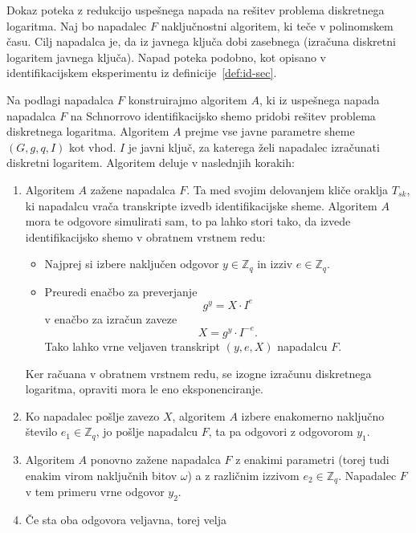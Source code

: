 \documentclass[isrm2, tisk]{fmfdelo}
\newcommand{\Z}{\mathbb Z}
\begin{document}
\begin{dokaz}
    Dokaz poteka z redukcijo uspešnega napada na rešitev problema diskretnega logaritma. Naj bo napadalec
    $F$ naključnostni algoritem, ki teče v polinomskem času. Cilj napadalca je, da iz javnega ključa
    dobi zasebnega (izračuna diskretni logaritem javnega ključa). Napad poteka podobno, kot opisano v
    identifikacijskem eksperimentu iz definicije~\ref{def:id-sec}.

    Na podlagi napadalca $F$ konstruirajmo algoritem $A$, ki iz uspešnega napada napadalca $F$ na
    Schnorrovo identifikacijsko shemo pridobi rešitev problema diskretnega logaritma. Algoritem $A$
    prejme vse javne parametre sheme $(G, g, q, I)$ kot vhod. $I$ je javni ključ, za katerega želi
    napadalec izračunati diskretni logaritem. Algoritem deluje v naslednjih korakih:
    \begin{enumerate}
        \item Algoritem $A$ zažene napadalca $F$. Ta med svojim delovanjem kliče oraklja $T_{sk}$,
            ki napadalcu vrača transkripte izvedb identifikacijske sheme. Algoritem $A$ mora te
            odgovore simulirati sam, to pa lahko stori tako, da izvede identifikacijsko shemo v
            obratnem vrstnem redu:
            \begin{itemize}
                \item Najprej si izbere naključen odgovor $y \in \Z_q$ in izziv $e \in \Z_q$.
                \item Preuredi enačbo za preverjanje
                    $$
                    g^y = X \cdot I^e
                    $$
                    v enačbo za izračun zaveze
                    $$
                    X = g^y \cdot I^{-e}.
                    $$
                    Tako lahko vrne veljaven transkript $(y, e, X)$ napadalcu $F$.
            \end{itemize}
            Ker račuana v obratnem vrstnem redu, se izogne izračunu diskretnega logaritma, opraviti
            mora le eno eksponenciranje.
        \item Ko napadalec pošlje zavezo $X$, algoritem $A$ izbere enakomerno naključno število $e_1
            \in \Z_q$, jo pošlje napadalcu $F$, ta pa odgovori z odgovorom $y_1$.
        \item Algoritem $A$ ponovno zažene napadalca $F$ z enakimi parametri (torej tudi enakim
            virom naključnih bitov $\omega$) a z različnim izzivom $e_2 \in \Z_q$. Napadalec
            $F$ v tem primeru vrne odgovor $y_2$.
        \item Če sta oba odgovora veljavna, torej velja

\end{enumerate}
\end{dokaz}
\end{document}
